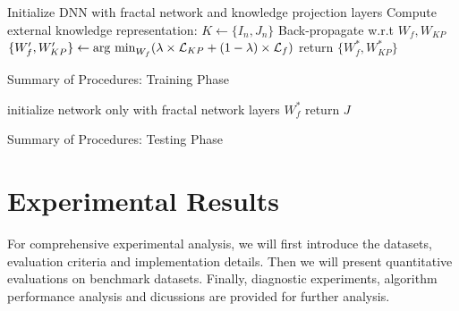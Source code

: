 \documentclass[journal ]{IEEEtran}
\newcommand{\argmin}{\operatornamewithlimits{arg\ min}} \usepackage[linesnumbered,ruled]{algorithm2e}
\begin{document}
\begin{algorithm}[h]
	\SetAlgoLined
	
    
   
    
	Initialize DNN with fractal network and knowledge projection layers\;
	{
		{
			Compute external knowledge representation: $K \longleftarrow \{ I_{n}, J_{n} \} $ \;
Back-propagate w.r.t $W_{f}, W_{KP}$ \;
		$ \{ W_{f}^{\prime}, W_{KP}^{\prime} \} \leftarrow \argmin_{W_{f}}(\lambda \times \mathcal{L}_{KP} + (1 - \lambda) \times \mathcal{L}_{f} )$ \;
	    }
	}
    return $\{ W_{f}^{*}, W_{KP}^{*} \}$
    
    
\caption{Summary of Procedures: Training Phase}
\label{algorithm:training}
\end{algorithm}

\begin{algorithm}[h]
	\SetAlgoLined
	
	
	
	initialize network only with fractal network layers $W_{f}^{*}$ \;
    return $J$
\caption{Summary of Procedures: Testing Phase}
\label{algorithm:testing}
\end{algorithm}

\section{Experimental Results}

For comprehensive experimental analysis, we will first introduce the datasets, evaluation criteria and implementation details. Then we will present quantitative evaluations on benchmark datasets. Finally, diagnostic experiments, algorithm performance analysis and dicussions are provided for further analysis.
\end{document}
